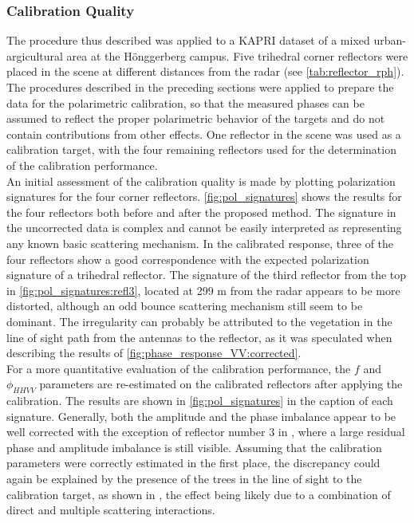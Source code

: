 \subsubsection{Calibration Quality}
The procedure thus described was applied to a KAPRI dataset of a mixed urban-argicultural area at the H\"{o}nggerberg campus. Five trihedral corner reflectors were placed in the scene at different distances from the radar (see \autoref{tab:reflector_rph}). The procedures described in the preceding sections were applied to prepare the data for the polarimetric calibration, so that the measured phases can be assumed to reflect the proper polarimetric behavior of the targets and do not contain contributions from other effects. One reflector in the scene was used as a calibration target, with the four remaining reflectors used for the determination of the calibration performance.\\
An initial assessment of the calibration quality is made by plotting polarization signatures\cite{VanZyl1987} for the four corner reflectors. \autoref{fig:pol_signatures} shows the results for the four reflectors both before and after the proposed method.
The signature in the uncorrected data is complex and cannot be easily interpreted as representing any known basic scattering mechanism. In the calibrated response, three of the four reflectors show a good correspondence with the expected polarization signature of a trihedral reflector. The signature of the third reflector from the top in \autoref{fig:pol_signatures:refl3}, located at 299 m from the radar appears to be more distorted, although an odd bounce scattering mechanism still seem to be dominant. The irregularity can probably be attributed to the vegetation in the line of sight path from the antennas to the reflector, as it was speculated when describing the results of \autoref{fig:phase_response_VV:corrected}.\\
For a more quantitative evaluation of the calibration performance, the $f$ and $\phi_{HHVV}$ parameters are re-estimated on the calibrated reflectors after applying the calibration. The results are shown in \autoref{fig:pol_signatures} in the caption of each signature. Generally, both the amplitude and the phase imbalance appear to be well corrected with the exception of reflector number 3 in , where a large residual phase and amplitude imbalance is still visible. Assuming that the calibration parameters were correctly estimated in the first place, the discrepancy could again be explained by the presence of the trees in the line of sight to the calibration target, as shown in , the effect being likely due to a combination of  direct and multiple scattering interactions.




